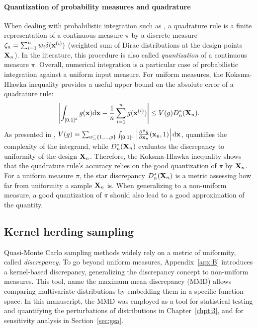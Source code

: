 \paragraph{Quantization of probability measures and quadrature}
When dealing with probabilistic integration such as , a quadrature rule is a finite representation of a continuous measure $\pi$ by a discrete measure $\zeta_n = \sum_{i=1}^n w_i \delta({\bf x}^{(i)})$ (weighted sum of Dirac distributions at the design points ${\bf X}_n$).
In the literature, this procedure is also called \emph{quantization} of a continuous measure $\pi$. 
Overall, numerical integration is a particular case of probabilistic integration against a uniform input measure. 
For uniform measures, the Koksma-Hlawka inequality \citep{morokoff_1995} provides a useful upper bound on the absolute error of a quadrature rule: 
\begin{equation}
    \left| \int_{[0, 1]^d} g({\bf x}) \mathrm{d} {\bf x} - \frac1n \sum_{i=1}^n g({\bf x}^{(i)})\right| \leq  V(g) D_n^*({\bf X}_n).
    \label{eq:KH_inequality}
\end{equation}
As presented in \cite{oates_21}, $V(g) = \sum_{\mathfrak{u}\subseteq\{1, \dots, p \}} \int_{[0, 1]^\mathfrak{u}} \left| \frac{\partial^{\mathfrak{u}}g}{\partial {\bf x}_{\mathfrak{u}}}({\bf x}_{\mathfrak{u}}, 1)\right| \mathrm{d}{\bf x}$, quantifies the complexity of the integrand, 
while $D_n^*({\bf X}_n)$ evaluates the discrepancy to uniformity of the design ${\bf X}_n$. 
Therefore, the Koksma-Hlawka inequality shows that the quadrature rule's accuracy relies on the good quantization of $\pi$ by ${\bf X}_n$. 
For a uniform measure $\pi$, the star discrepancy $D_n^*({\bf X}_n)$ is a metric assessing how far from uniformity a sample ${\bf X}_n$ is. 
When generalizing to a non-uniform measure, a good quantization of $\pi$ should also lead to a good approximation of the quantity. 


\subsection{Kernel herding sampling}\label{sec:4khsubsec}

Quasi-Monte Carlo sampling methods widely rely on a metric of uniformity, called \textit{discrepancy}. 
To go beyond uniform measures, Appendix~\ref{apx:B} introduces a kernel-based discrepancy, generalizing the discrepancy concept to non-uniform measures. 
This tool, name the maximum mean discrepancy (MMD) allows comparing multivariate distributions by embedding them in a specific function space. 
In this manuscript, the MMD was employed as a tool for statistical testing and quantifying the perturbations of distributions in Chapter~\ref{chpt:3}, and for sensitivity analysis in Section~\ref{sec:gsa}.

